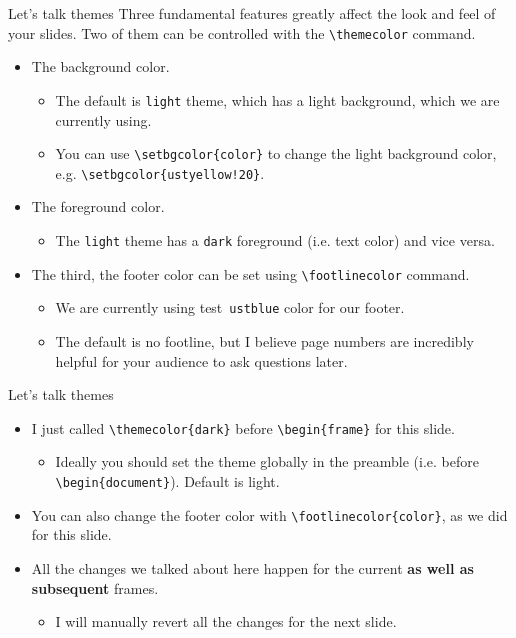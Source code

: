 \documentclass[]{beamer}
\newcommand{\testcolor}[1]{\colorbox{#1}{\textcolor{#1}{test}}~\texttt{#1}}
\begin{document}
\begin{frame}[fragile]{Let's talk themes}
Three fundamental features greatly affect the look and feel of your slides. Two of them can be controlled with the \verb|\themecolor| command.
\begin{itemize}
\item The background color.
\begin{itemize}
    \item The default is \verb|light| theme, which has a light background, which we are currently using.
    \item You can use \verb|\setbgcolor{color}| to change the light background color, e.g. \verb|\setbgcolor{ustyellow!20}|.
\end{itemize}
\item The foreground color.
\begin{itemize}
    \item The \verb|light| theme has a \verb|dark| foreground (i.e. text color) and vice versa.
\end{itemize}
\item The third, the footer color can be set using \verb|\footlinecolor| command.
\begin{itemize}
    \item We are currently using \testcolor{ustblue} color for our footer.
    \item The default is no footline, but I believe page numbers are incredibly helpful for your audience to ask questions later.
\end{itemize}
\end{itemize}
\end{frame}


\begin{frame}[fragile]{Let's talk themes}
\begin{itemize}
\item I just called \verb|\themecolor{dark}| before \verb|\begin{frame}| for this slide.
\begin{itemize}
    \item Ideally you should set the theme globally in the preamble (i.e. before \verb|\begin{document}|). Default is light.
\end{itemize}
\item You can also change the footer color with \verb|\footlinecolor{color}|, as we did for this slide.
\item All the changes we talked about here happen for the current \textbf{as well as subsequent} frames.
\begin{itemize}
    \item I will manually revert all the changes for the next slide.
\end{itemize}
\end{itemize}
\end{frame}
\end{document}

